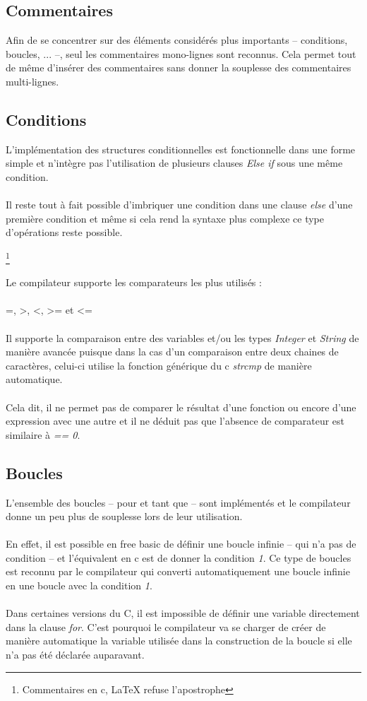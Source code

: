 \documentclass{article}
\begin{document}
\subsection{Commentaires}
Afin de se concentrer sur des éléments considérés plus importants -- conditions, boucles, ... --, seul les
commentaires mono-lignes sont reconnus. Cela permet tout de même d'insérer des commentaires sans donner 
la souplesse des commentaires multi-lignes.

\subsection{Conditions}
L'implémentation des structures conditionnelles est fonctionnelle dans une forme simple et n'intègre pas
l'utilisation de plusieurs clauses \emph{Else if} sous une même condition.
\\\\
Il reste tout à fait possible d'imbriquer une condition dans une clause \emph{else} d'une première condition et
même si cela rend la syntaxe plus complexe ce type d'opérations reste possible.

\lstset{language=c,caption=Raccourci de syntaxe pour les conditions, upquote=true}
\footnote{Commentaires en c, LaTeX refuse l'apostrophe}

Le compilateur supporte les comparateurs les plus utilisés : 	
\\\\
=, >, <, >= et <=
\\\\
Il supporte la comparaison entre 
des variables et/ou les types \emph{Integer} et \emph{String} de manière avancée puisque dans la cas d'un comparaison
entre deux chaines de caractères, celui-ci utilise la fonction générique du c \emph{strcmp} de manière automatique.
\\\\
Cela dit, il ne permet pas de comparer le résultat d'une fonction ou encore d'une expression avec une autre et il 
ne déduit pas que l'absence de comparateur est similaire à \emph{== 0}.
\subsection{Boucles}
L'ensemble des boucles -- pour et tant que -- sont implémentés et le compilateur donne un peu plus 
de souplesse lors de leur utilisation.
\\\\
En effet, il est possible en free basic de définir une boucle infinie -- qui n'a pas de condition -- et 
l'équivalent en c est de donner la condition \emph{1}. Ce type de boucles est reconnu par le 
compilateur qui converti automatiquement une boucle infinie en une boucle avec la condition \emph{1}.
\\\\
Dans certaines versions du C, il est impossible de définir une variable directement dans la clause \emph{for}.
C'est pourquoi le compilateur va se charger de créer de manière automatique la variable utilisée dans 
la construction de la boucle si elle n'a pas été déclarée auparavant.
\end{document}
